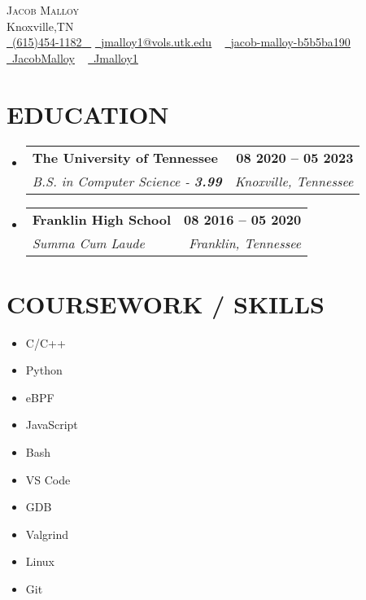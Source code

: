 \documentclass[letterpaper,11pt]{article}
\makeatletter
\newcommand{\resumeSubheading}[4]{
    \vspace{-2pt}\item
        \begin{tabular*}{1.0\textwidth}[t]{l@{\extracolsep{\fill}}r}
            \textbf{\large#1} & \textbf{\small #2} \\
            \textit{\large#3} & \textit{\small #4} \\

        \end{tabular*}\vspace{-7pt}
}
\newcommand{\resumeSubHeadingListStart}{\begin{itemize}[leftmargin=0.0in, label={}]}
\newcommand{\resumeSubHeadingListEnd}{\end{itemize}}
\makeatother
\begin{document}

\begin{center}
        {\Huge \scshape Jacob Malloy} \\ \vspace{1pt}
        Knoxville,TN \\ \vspace{1pt}
        \small \href{tel:+16154541182}{ \raisebox{-0.1\height}\faPhone\ \underline{(615)454-1182} ~} \href{mailto:jmalloy1@vols.utk.edu}{\raisebox{-0.2\height}\faEnvelope\  \underline{jmalloy1@vols.utk.edu}} ~
        \href{https://www.linkedin.com/in/jacob-malloy-b5b5ba190/}{\raisebox{-0.2\height}\faLinkedinSquare\ \underline{jacob-malloy-b5b5ba190}}  ~
        \href{https://github.com/jacobmalloy}{\raisebox{-0.2\height}\faGithub\ \underline{JacobMalloy}} ~
        \href{https://gitlab.com/jmalloy1}{\raisebox{-0.2\height}\faGitlab\ \underline{Jmalloy1}} ~
        \vspace{-8pt}
\end{center}


\section{EDUCATION}
    \resumeSubHeadingListStart
        \resumeSubheading
            {The University of Tennessee}{08 2020 -- 05 2023}
            {B.S. in Computer Science - \textbf{3.99}}{Knoxville, Tennessee}
        \resumeSubheading
            {Franklin High School}{08 2016 -- 05 2020}
            {Summa Cum Laude}{Franklin, Tennessee}
    \resumeSubHeadingListEnd

\section{COURSEWORK / SKILLS}
                \begin{multicols}{5}
                        \begin{itemize}[itemsep=-2pt, parsep=4pt]
                                \item C/C++
                                \item Python
                                \item eBPF
                                \item JavaScript
                                \item Bash
                                \item VS Code
                                \item GDB
                                \item Valgrind
                                \item Linux
                                \item Git
                        \end{itemize}
                \end{multicols}
                \vspace*{2.0\multicolsep}
\end{document}
